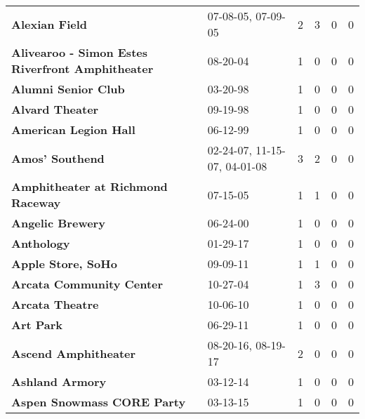 \begin{supertabular}{llllll}
                                               \textbf{Alexian Field} &            07-08-05, 07-09-05 &  2 &   3 &  0 &  0 \\
             \textbf{Alivearoo - Simon Estes Riverfront Amphitheater} &                      08-20-04 &  1 &   0 &  0 &  0 \\
                                          \textbf{Alumni Senior Club} &                      03-20-98 &  1 &   0 &  0 &  0 \\
                                              \textbf{Alvard Theater} &                      09-19-98 &  1 &   0 &  0 &  0 \\
                                        \textbf{American Legion Hall} &                      06-12-99 &  1 &   0 &  0 &  0 \\
                                              \textbf{Amos' Southend} &  02-24-07, 11-15-07, 04-01-08 &  3 &   2 &  0 &  0 \\
                            \textbf{Amphitheater at Richmond Raceway} &                      07-15-05 &  1 &   1 &  0 &  0 \\
                                             \textbf{Angelic Brewery} &                      06-24-00 &  1 &   0 &  0 &  0 \\
                                                   \textbf{Anthology} &                      01-29-17 &  1 &   0 &  0 &  0 \\
                                           \textbf{Apple Store, SoHo} &                      09-09-11 &  1 &   1 &  0 &  0 \\
                                     \textbf{Arcata Community Center} &                      10-27-04 &  1 &   3 &  0 &  0 \\
                                              \textbf{Arcata Theatre} &                      10-06-10 &  1 &   0 &  0 &  0 \\
                                                    \textbf{Art Park} &                      06-29-11 &  1 &   0 &  0 &  0 \\
                                         \textbf{Ascend Amphitheater} &            08-20-16, 08-19-17 &  2 &   0 &  0 &  0 \\
                                              \textbf{Ashland Armory} &                      03-12-14 &  1 &   0 &  0 &  0 \\
                                   \textbf{Aspen Snowmass CORE Party} &                      03-13-15 &  1 &   0 &  0 &  0 \\

\end{supertabular}
